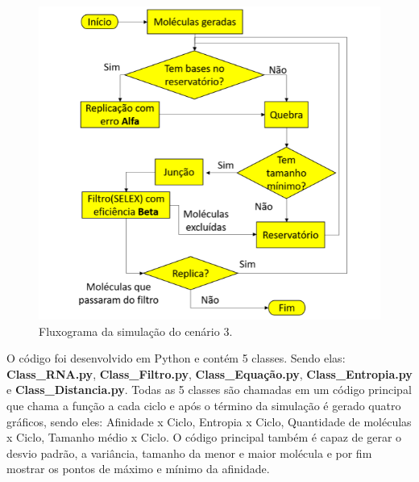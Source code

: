 \newpage

\begin{figure}[!h]
    \centering
    \includegraphics[width=14cm]{figures/img-fluxo3.png}
    \caption{Fluxograma da simulação do cenário 3.}
    \label{fig:fluxograma-cen3}
\end{figure}

O código foi desenvolvido em Python e contém 5 classes. Sendo elas:\\
\textbf{Class\_RNA.py}, \textbf{Class\_Filtro.py}, \textbf{Class\_Equação.py}, \textbf{Class\_Entropia.py} e
\textbf{Class\_Distancia.py}. Todas as 5 classes são chamadas em um código principal que chama a função a cada ciclo e após o término da simulação é gerado quatro gráficos, sendo eles: Afinidade x Ciclo, Entropia x Ciclo, Quantidade de moléculas x Ciclo, Tamanho médio x Ciclo. O código principal também é capaz de gerar o desvio padrão, a
variância, tamanho da menor e maior molécula e por fim mostrar os pontos de máximo e mínimo da afinidade.

